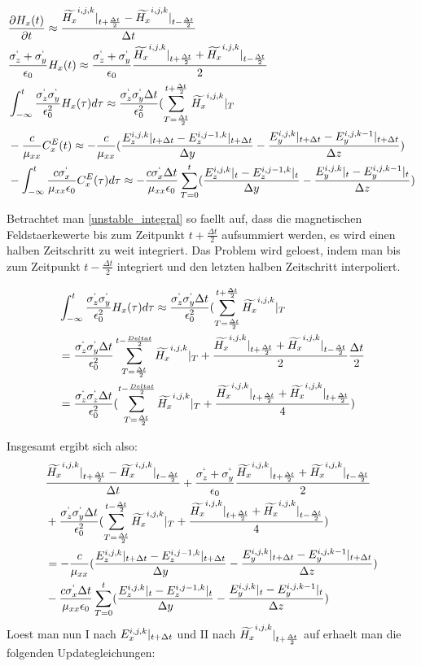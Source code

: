 \documentclass[11pt, ngerman]{article}
\begin{document}
\begin{align}
	&\frac{\partial H_x(t)}{\partial t} \approx \frac{\Hf{x}{i,j,k}{+} - \Hf{x}{i,j,k}{-}}{\Delta t}\\
	&\frac{\sgma_z + \sgma_y}{\epsilon_0}H_x(t) \approx \frac{\sgma_z + \sgma_y}{\epsilon_0}\frac{\Hf{x}{i,j,k}{+} + \Hf{x}{i,j,k}{-}}{2}\\
	&\int_{-\infty}^t\frac{\sgma_z\sgma_y}{\epsilon_0^2}H_x(\tau)d\tau \approx \frac{\sgma_z\sgma_y\Delta t}{\epsilon_0^2}(\sum_{T=\frac{\Delta t}{2}}^{t+\frac{\Delta t}{2}}\Hf{x}{i,j,k}{T}\label{unstable_integral}\\
	&-\frac{c}{\mu_{xx}}C_x^E(t) \approx -\frac{c}{\mu_{xx}}(\frac{\Ef{z}{i,j,k}{+} - \Ef{z}{i,j-1,k}{+}}{\Delta y} - \frac{\Ef{y}{i,j,k}{+} - \Ef{y}{i,j,k-1}{+}}{\Delta z})\\
	&-\int_{-\infty}^t\frac{c\sgma_x}{\mu_{xx}\epsilon_0}C_x^E(\tau)d\tau \approx -\frac{c\sgma_x\Delta t}{\mu_{xx}\epsilon_0}\sum_{T = 0}^t(\frac{\Ef{z}{i,j,k}{0}-\Ef{z}{i,j-1,k}{0}}{\Delta y}-\frac{\Ef{y}{i,j,k}{0}-\Ef{y}{i,j,k-1}{0}}{\Delta z})
\end{align}

Betrachtet man \cref{unstable_integral} so faellt auf, dass die magnetischen Feldstaerkewerte bis zum Zeitpunkt \(t+\frac{\Delta t}{2}\) aufsummiert werden, es wird einen
halben Zeitschritt zu weit integriert. Das Problem wird geloest, indem man bis zum Zeitpunkt \(t - \frac{\Delta t}{2}\) integriert und den letzten halben Zeitschritt interpoliert.

\begin{align}
	&\int_{-\infty}^t\frac{\sgma_z\sgma_y}{\epsilon_0^2}H_x(\tau)d\tau \approx \frac{\sgma_z\sgma_y\Delta t}{\epsilon_0^2}(\sum_{T=\frac{\Delta t}{2}}^{t+\frac{\Delta t}{2}}\Hf{x}{i,j,k}{T}\\
	& = \frac{\sgma_z\sgma_y\Delta t}{\epsilon_0^2}\sum_{T=\frac{\Delta t}{2}}^{t-\frac{Delta t}{2}}\Hf{x}{i,j,k}{T} + \frac{\Hf{x}{i,j,k}{+}+\Hf{x}{i,j,k}{-}}{2}\frac{\Delta t}{2}\\
	& = \frac{\sgma_z\sgma_z\Delta t}{\epsilon_0^2}(\sum_{T=\frac{\Delta t}{2}}^{t-\frac{Delta t}{2}}\Hf{x}{i,j,k}{T} + \frac{\Hf{x}{i,j,k}{+} + \Hf{x}{i,j,k}{+}}{4})
\end{align}

Insgesamt ergibt sich also:
\begin{align}
	&\frac{\Hf{x}{i,j,k}{+} - \Hf{x}{i,j,k}{-}}{\Delta t} + \frac{\sgma_z + \sgma_y}{\epsilon_0}\frac{\Hf{x}{i,j,k}{+} + \Hf{x}{i,j,k}{-}}{2}\\
	&+\frac{\sgma_z\sgma_y\Delta t}{\epsilon_0^2}(\sum_{T=\frac{\Delta t}{2}}^{t-\frac{\Delta t}{2}}\Hf{x}{i,j,k}{T} + \frac{\Hf{x}{i,j,k}{+} + \Hf{x}{i,j,k}{-}}{4})\\
	&= -\frac{c}{\mu_{xx}}(\frac{\Ef{z}{i,j,k}{+} - \Ef{z}{i,j-1,k}{+}}{\Delta y} - \frac{\Ef{y}{i,j,k}{+} - \Ef{y}{i,j,k-1}{+}}{\Delta z})\\
	&-\frac{c\sgma_x\Delta t}{\mu_{xx}\epsilon_0}\sum_{T = 0}^t(\frac{\Ef{z}{i,j,k}{0}-\Ef{z}{i,j-1,k}{0}}{\Delta y}-\frac{\Ef{y}{i,j,k}{0}-\Ef{y}{i,j,k-1}{0}}{\Delta z})
\end{align}
Loest man nun I nach \(\Ef{x}{i,j,k}{+}\) und II nach \(\Hf{x}{i,j,k}{+}\) auf erhaelt man die folgenden Updategleichungen:
\end{document}
